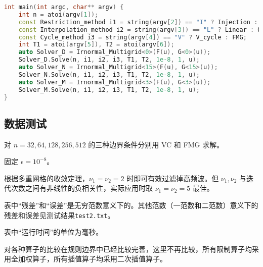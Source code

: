 \documentclass{ctexart}
\begin{document}
\begin{lstlisting}[language=c++]
int main(int argc, char** argv) {
	int n = atoi(argv[1]);
	const Restriction_method i1 = string(argv[2]) == "I" ? Injection : Full_Weighting;
	const Interpolation_method i2 = string(argv[3]) == "L" ? Linear : Quadratic;
	const Cycle_method i3 = string(argv[4]) == "V" ? V_cycle : FMG;
	int T1 = atoi(argv[5]), T2 = atoi(argv[6]);
	auto Solver_D = Irnormal_Multigrid<0>(F(u), G<0>(u));
	Solver_D.Solve(n, i1, i2, i3, T1, T2, 1e-8, 1, u);
	auto Solver_N = Irnormal_Multigrid<15>(F(u), G<15>(u));
	Solver_N.Solve(n, i1, i2, i3, T1, T2, 1e-8, 1, u);
	auto Solver_M = Irnormal_Multigrid<3>(F(u), G<3>(u));
	Solver_M.Solve(n, i1, i2, i3, T1, T2, 1e-8, 1, u);
}
\end{lstlisting}

\subsection{数据测试}

对 $n=32,64,128,256,512$ 的三种边界条件分别用 VC 和 FMG 求解。

固定 $\epsilon = 10^{-8}$。

根据多重网格的收敛定理，$\nu_1=\nu_2=2$ 时即可有效过滤掉高频波。但 $\nu_1,\nu_2$ 与迭代次数之间有非线性的负相关性，实际应用时取 $\nu_1=\nu_2=5$ 最佳。

表中“残差”和“误差”是无穷范数意义下的。其他范数（一范数和二范数）意义下的残差和误差见测试结果\verb|test2.txt|。

表中“运行时间”的单位为毫秒。

对各种算子的比较在规则边界中已经比较完善，这里不再比较，所有限制算子均采用全加权算子，所有插值算子均采用二次插值算子。
\end{document}
